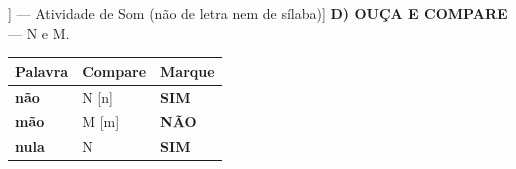 \begin{exercicio}[Som /n/ [[n]] --- Atividade de Som (não de letra nem de sílaba)]
\textbf{D) OUÇA E COMPARE} --- N e M.

\begin{center}
\begin{tabular}{@{}p{4.2cm}p{6.2cm}p{1.6cm}@{}}
\hline
\textbf{Palavra} & \textbf{Compare} & \textbf{Marque} \\
\hline
\textbf{não} & N [n] & \textbf{SIM} \\
\textbf{mão} & M [m] & \textbf{NÃO} \\
\textbf{nula} & N & \textbf{SIM} \\
\hline
\end{tabular}
\end{center}

\end{exercicio}

